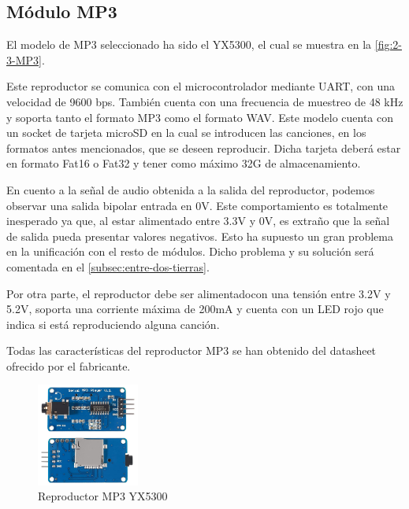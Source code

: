\subsection{Módulo MP3}
El modelo de MP3 seleccionado ha sido el YX5300, el cual se muestra en la \autoref{fig:2-3-MP3}.

Este reproductor se comunica con el microcontrolador mediante UART, con una velocidad de 9600 bps. También cuenta con una frecuencia de muestreo de 48 kHz y soporta tanto el formato MP3 como el formato WAV. Este modelo cuenta con un socket de tarjeta microSD en la cual se introducen las canciones, en los formatos antes mencionados, que se deseen reproducir. Dicha tarjeta deberá estar en formato Fat16 o Fat32 y tener como máximo 32G de almacenamiento.

En cuento a la señal de audio obtenida a la salida del reproductor, podemos observar una salida bipolar entrada en 0V. Este comportamiento es totalmente inesperado ya que, al estar alimentado entre 3.3V y 0V, es extraño que la señal de salida pueda presentar valores negativos. Esto ha supuesto un gran problema en la unificación con el resto de módulos. Dicho problema y su solución será comentada en el \autoref{subsec:entre-dos-tierras}.

Por otra parte, el reproductor debe ser alimentadocon una tensión entre 3.2V y 5.2V, soporta una corriente máxima de 200mA y cuenta con un LED rojo que indica si está reproduciendo alguna canción.

Todas las características del reproductor MP3 se han obtenido del datasheet ofrecido por el fabricante.

\begin{figure}[h]
    \centering
    \includegraphics[width=0.3\textwidth]{images/2/2-4/MP3.jpg}
    \caption{Reproductor MP3 YX5300}
    \label{fig:2-3-MP3}
\end{figure}